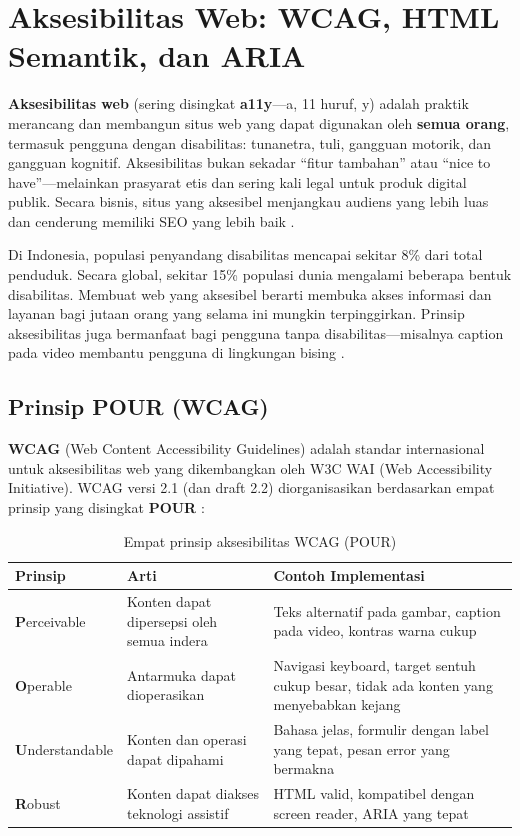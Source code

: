 ﻿\section{Aksesibilitas Web: WCAG, HTML Semantik, dan ARIA}

\textbf{Aksesibilitas web} (sering disingkat \textbf{a11y}---a, 11 huruf, y) adalah praktik merancang dan membangun situs web yang dapat digunakan oleh \textbf{semua orang}, termasuk pengguna dengan disabilitas: tunanetra, tuli, gangguan motorik, dan gangguan kognitif. Aksesibilitas bukan sekadar ``fitur tambahan'' atau ``nice to have''---melainkan prasyarat etis dan sering kali legal untuk produk digital publik. Secara bisnis, situs yang aksesibel menjangkau audiens yang lebih luas dan cenderung memiliki SEO yang lebih baik \cite{mdnAccessibility}.

Di Indonesia, populasi penyandang disabilitas mencapai sekitar 8\% dari total penduduk. Secara global, sekitar 15\% populasi dunia mengalami beberapa bentuk disabilitas. Membuat web yang aksesibel berarti membuka akses informasi dan layanan bagi jutaan orang yang selama ini mungkin terpinggirkan. Prinsip aksesibilitas juga bermanfaat bagi pengguna tanpa disabilitas---misalnya caption pada video membantu pengguna di lingkungan bising \cite{webdevAccessibility}.

\subsection{Prinsip POUR (WCAG)}

\textbf{WCAG} (Web Content Accessibility Guidelines) adalah standar internasional untuk aksesibilitas web yang dikembangkan oleh W3C WAI (Web Accessibility Initiative). WCAG versi 2.1 (dan draft 2.2) diorganisasikan berdasarkan empat prinsip yang disingkat \textbf{POUR} \cite{wcagW3c}:

\begin{table}[H]
\centering
\begin{tabular}{|P{2.8cm}|P{4cm}|P{5.5cm}|}
\hline
\textbf{Prinsip} & \textbf{Arti} & \textbf{Contoh Implementasi} \\
\hline
\textbf{P}erceivable & Konten dapat dipersepsi oleh semua indera & Teks alternatif pada gambar, caption pada video, kontras warna cukup \\
\hline
\textbf{O}perable & Antarmuka dapat dioperasikan & Navigasi keyboard, target sentuh cukup besar, tidak ada konten yang menyebabkan kejang \\
\hline
\textbf{U}nderstandable & Konten dan operasi dapat dipahami & Bahasa jelas, formulir dengan label yang tepat, pesan error yang bermakna \\
\hline
\textbf{R}obust & Konten dapat diakses teknologi assistif & HTML valid, kompatibel dengan screen reader, ARIA yang tepat \\
\hline
\end{tabular}
\caption{Empat prinsip aksesibilitas WCAG (POUR)}
\end{table}

